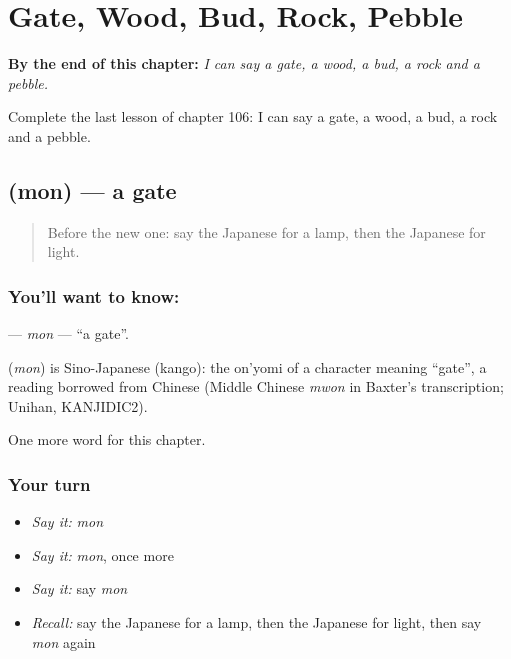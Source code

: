 
\chapter{Gate, Wood, Bud, Rock, Pebble}
\label{ch:ja-gate-wood-bud-rock-pebble}

\begin{chapteropening}
\textbf{By the end of this chapter:} \emph{I can say a gate, a wood, a bud, a rock and a pebble.}

Complete the last lesson of chapter 106: I can say a gate, a wood, a bud, a rock and a pebble.
\end{chapteropening}

\section[\texorpdfstring{\ja{もん} (mon)}{もん (mon)}]{ (mon) — a gate}

\label{lesson:JA-C106-mon}



\begin{quote}
Before the new one: say the Japanese for a lamp, then the Japanese for light.
\end{quote}

\subsection*{You'll want to know: }
\textbf{} — \emph{mon} — \textquotedblleft{}a gate\textquotedblright{}.

\begin{cousinweb}
\textbf{} (\emph{mon}) is Sino-Japanese (kango): the on'yomi of a character meaning \textquotedblleft{}gate\textquotedblright{}, a reading borrowed from Chinese (Middle Chinese \emph{mwon} in Baxter's transcription; Unihan, KANJIDIC2).
\end{cousinweb}

\begin{grammarlens}[title={What you've built}]
One more word for this chapter.
\end{grammarlens}

\subsection*{Your turn}
\begin{itemize}
\raggedright
  \item \emph{Say it:} \emph{mon}
  \item \emph{Say it:} \emph{mon}, once more
  \item \emph{Say it:} say \emph{mon}
  \item \emph{Recall:} say the Japanese for a lamp, then the Japanese for light, then say \emph{mon} again
\end{itemize}


